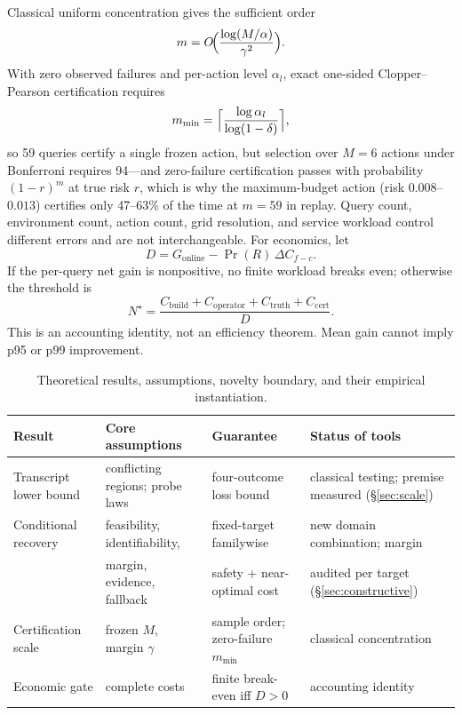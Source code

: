 \documentclass{article}
\renewcommand{\Pr}{\mathop{\mathrm{Pr}}}   %
\begin{document}
Classical uniform concentration gives the sufficient order
\begin{equation}
m=O\!\Bigl(\frac{\log(M/\alpha)}{\gamma^{2}}\Bigr).
\label{eq:mscale}
\end{equation}
With zero observed failures and per-action level $\alpha_l$, exact one-sided Clopper--Pearson certification
requires
\begin{equation}
m_{\min}=\Bigl\lceil\frac{\log\alpha_{l}}{\log(1-\delta)}\Bigr\rceil,
\label{eq:mmin}
\end{equation}
so 59 queries certify a single frozen action, but selection over $M=6$ actions under Bonferroni requires
94---and zero-failure certification passes with probability $(1-r)^m$ at true risk $r$, which is why the
maximum-budget action (risk $0.008$--$0.013$) certifies only 47--63\% of the time at $m=59$ in replay.
Query count, environment count, action count, grid resolution, and service workload control different
errors and are not interchangeable. For economics, let
\begin{equation}
D=G_{\mathrm{online}}-\Pr(R)\,\Delta C_{f\!-\!c}.
\label{eq:dgain}
\end{equation}
If the per-query net gain is nonpositive, no finite workload breaks even; otherwise the threshold is
\begin{equation}
N^{\star}=\frac{C_{\mathrm{build}}+C_{\mathrm{operator}}+C_{\mathrm{truth}}+C_{\mathrm{cert}}}{D}.
\label{eq:breakeven}
\end{equation}
This is an accounting identity, not an efficiency theorem. Mean gain cannot imply p95 or p99 improvement.

\begin{table}[t]
\centering
\caption{Theoretical results, assumptions, novelty boundary, and their empirical instantiation.}
\label{tab:theory}
\footnotesize
\setlength{\tabcolsep}{3.5pt}
\begin{tabular}{p{2.5cm}p{3.3cm}p{3.5cm}p{3.5cm}}
\toprule
Result & Core assumptions & Guarantee & Status of tools \\
\midrule
Transcript lower bound & conflicting regions; probe laws & four-outcome loss bound & classical testing; premise measured (\S\ref{sec:scale}) \\
Conditional recovery & feasibility, identifiability, & fixed-target familywise & new domain combination; margin \\
 & margin, evidence, fallback & safety + near-optimal cost & audited per target (\S\ref{sec:constructive}) \\
Certification scale & frozen $M$, margin $\gamma$ & sample order; zero-failure $m_{\min}$ & classical concentration \\
Economic gate & complete costs & finite break-even iff $D>0$ & accounting identity \\
\bottomrule
\end{tabular}
\end{table}
\end{document}
